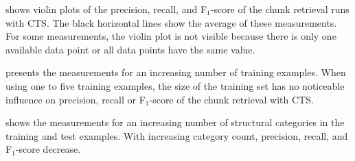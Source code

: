  shows violin plots
of the precision,
recall, and F$_{1}$-score of the chunk retrieval runs with CTS.
The black horizontal lines show the average of these measurements.
For some measurements, the violin plot is not visible because there is
only one available data point or all data points have the same value.

 presents the
measurements for an
increasing number of training examples.
When using one to five
training examples, the size of the training set has no noticeable
influence on precision, recall or F$_{1}$-score of the chunk retrieval
with CTS.

 shows the
measurements for an increasing number of structural categories in the
training and test examples.
With increasing category count, precision,
recall, and F$_{1}$-score decrease.

